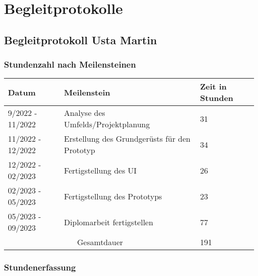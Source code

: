 \thispagestyle{empty}
\section{Begleitprotokolle}

\pagebreak

\subsection{Begleitprotokoll Usta Martin}

\subsubsection{Stundenzahl nach Meilensteinen}
\begin{tabular}{|m{}|m{}|m{}|}
    \hline
    \cellcolor{gray!10} Datum & \cellcolor{gray!10} Meilenstein & \cellcolor{gray!10} Zeit in Stunden \\
    \hline
    9/2022 - 11/2022 & Analyse des Umfelds/Projektplanung & 31 \\
    \hline
    11/2022 - 12/2022 & Erstellung des Grundgerüsts für den Prototyp & 34 \\
    \hline
    12/2022 - 02/2023 & Fertigstellung des UI & 26 \\
    \hline
    02/2023 - 05/2023 & Fertigstellung des Prototyps & 23 \\
    \hline
    05/2023 - 09/2023 & Diplomarbeit fertigstellen & 77 \\ 
    \hline
    \multicolumn{2}{|c|}{\cellcolor{gray!30}Gesamtdauer} & 191 \\
    \hline
\end{tabular}

\noindent

\vspace{40pt}

\subsubsection{Stundenerfassung}

